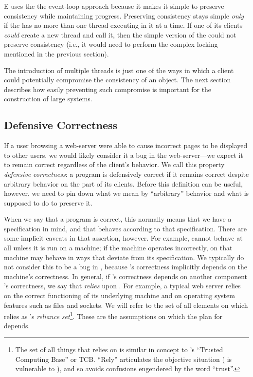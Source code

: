 \documentclass{llncs}
\begin{document}
E uses the the event-loop approach because it makes it simple to
preserve consistency while maintaining progress.  Preserving
consistency stays simple \emph{only} if the  has no
more than one thread executing in it at a time.  If one of its clients
\emph{could} create a new thread and call it, then the simple version
of the  could not preserve consistency (i.e., it
would need to perform the complex locking mentioned in the previous
section). 

The introduction of multiple threads is just one of the ways in which
a client could potentially compromise the consistency of an object.
The next section describes how easily preventing such compromise is
important for the construction of large systems. 


\subsection{Defensive Correctness}

If a user browsing a web-server were able to cause incorrect pages to
be displayed to other users, we would likely consider it a bug in the
web-server---we expect it to remain correct regardless of the
client's behavior.  We call this property \emph{defensive
correctness}: a program  is defensively correct if it remains
correct despite arbitrary behavior on the part of its clients.  Before
this definition can be useful, however, we need to pin down what we
mean by ``arbitrary'' behavior and what  is supposed to do to
preserve it.

When we say that a program  is correct, this normally means
that we have a specification in mind, and that  behaves
according to that specification.  There are some implicit caveats in
that assertion, however. For example,  cannot behave at all
unless it is run on a machine; if the machine operates incorrectly,
 on that machine may behave in ways that deviate from its
specification.  We typically do not consider this to be a bug in
, because 's correctness implicitly depends on the
machine's correctness.  In general, if 's correctness depends
on another component 's correctness, we say that 
\emph{relies} upon .  For example, a typical web server
relies on the correct functioning of its underlying machine and on
operating system features such as files and sockets.  We will refer to
the set of all elements on which  relies as 's
\emph{reliance set}\footnote{
%
     The set of all things that  relies on is
     similar in concept to 's ``Trusted Computing Base'' or
     TCB. ``Rely'' articulates the objective situation ( is
     vulnerable to ), and so avoids confusions engendered by
     the word ``trust''.}.
%
These are the assumptions on which the plan for  depends.
\end{document}
